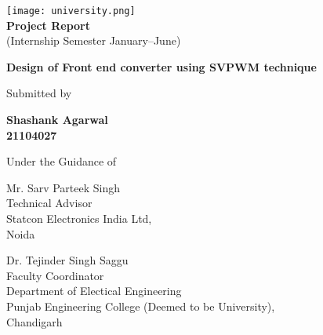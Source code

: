 \begin{titlepage}
    \begin{center}
        \texttt{[image: university.png]}\\
        {\textbf{Project Report}}\\
        \vspace*{0.2cm}
        (Internship Semester January--June)

        \vspace*{3cm}
        {\Large\textbf {Design of Front end converter using SVPWM technique}}

        \vfill
        Submitted by

        \vfill
        \textbf{
        Shashank Agarwal\\
        21104027
        }

        \vfill
        Under the Guidance of
    \end{center}
    \vfill

    \noindent
    \begin{minipage}[t]{0.5\textwidth}
        \raggedright
        Mr. Sarv Parteek Singh\\
        Technical Advisor\\
        Statcon Electronics India Ltd,\\
        Noida
    \end{minipage}
    \hfill
    \begin{minipage}[t]{0.5\textwidth}
        \raggedleft
        Dr. Tejinder Singh Saggu\\
        Faculty Coordinator\\
        Department of Electical Engineering\\
        Punjab Engineering College (Deemed to be University),\\
        Chandigarh
    \end{minipage}
\end{titlepage}